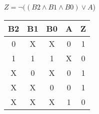 
\begin{center}
    {\(Z = \lnot ((B2 \land B1 \land B0) \lor A \))}
    \begin{table}[h] %
        \begin{center}
            \begin{tabular}{|c|c|c|c||c|} \hline
            B2 & B1 & B0 & A & Z \\ \hline\hline
            0  & X  & X  & 0 & 1 \\ \hline
            1  & 1  & 1  & X & 0 \\ \hline
            X  & 0  & X  & 0 & 1 \\ \hline
            X  & X  & 0  & 0 & 1 \\ \hline
            X  & X  & X  & 1 & 0 \\ \hline
            \end{tabular}
        \end{center}
    \end{table}
\end{center}
